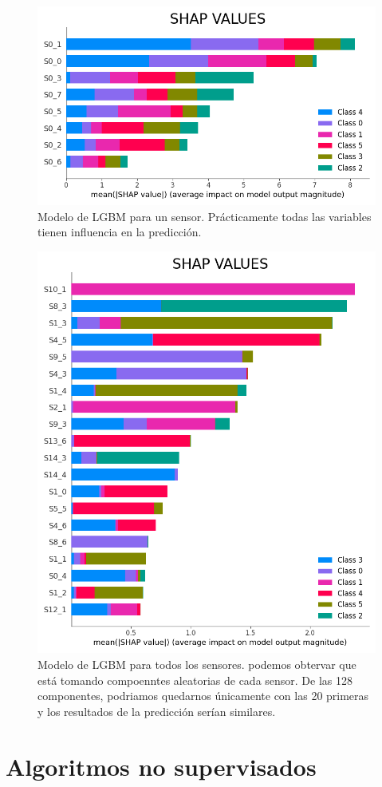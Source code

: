 \begin{figure}
	\centering
	\includegraphics[width=0.7\linewidth]{../py_imgs/Step4_LGBM_one_sensor}
	\caption[Modelo LGBM-1sensor]{Modelo de LGBM para un sensor. Prácticamente todas las variables tienen influencia en la predicción. }
	\label{fig:step4lgbmonesensor}
\end{figure}

\begin{figure}
	\centering
	\includegraphics[width=0.7\linewidth]{"../py_imgs/Step4_LGBM_all data"}
	\caption[Modelo LGBM-6sensores]{Modelo de LGBM para todos los sensores. podemos obtervar que está tomando compoenntes aleatorias de cada sensor. De las 128 componentes, podriamos quedarnos únicamente con las 20 primeras y los resultados de la predicción serían similares. }
	\label{fig:step4lgbmall-data}
\end{figure}


\section{Algoritmos no supervisados}

